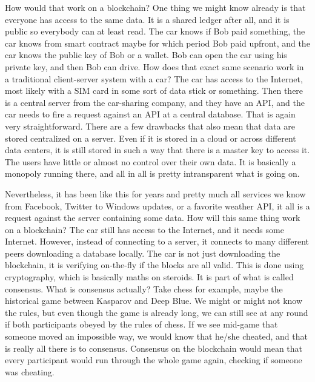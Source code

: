 How would that work on a blockchain? One thing we might know already is that everyone has access to the same data. It is a shared ledger after all, and it is public so everybody can at least read. The car knows if Bob paid something, the car knows from smart contract maybe for which period Bob paid upfront, and the car knows the public key of Bob or a wallet. Bob can open the car using his private key, and then Bob can drive. How does that exact same scenario work in a traditional client-server system with a car? The car has access to the Internet, most likely with a SIM card in some sort of data stick or something. Then there is a central server from the car-sharing company, and they have an API, and the car needs to fire a request against an API at a central database. That is again very straightforward. There are a few drawbacks that also mean that data are stored centralized on a server. Even if it is stored in a cloud or across different data centers, it is still stored in such a way that there is a master key to access it. The users have little or almost no control over their own data. It is basically a monopoly running there, and all in all is pretty intransparent what is going on.

Nevertheless, it has been like this for years and pretty much all services we know from Facebook, Twitter to Windows updates, or a favorite weather API, it all is a request against the server containing some data. How will this same thing work on a blockchain? The car still has access to the Internet, and it needs some Internet. However, instead of connecting to a server, it connects to many different peers downloading a database locally. The car is not just downloading the blockchain, it is verifying on-the-fly if the blocks are all valid. This is done using cryptography, which is basically maths on steroids. It is part of what is called consensus. What is consensus actually? Take chess for example, maybe the historical game between Kasparov and Deep Blue. We might or might not know the rules, but even though the game is already long, we can still see at any round if both participants obeyed by the rules of chess. If we see mid-game that someone moved an impossible way, we would know that he/she cheated, and that is really all there is to consensus. Consensus on the blockchain would mean that every participant would run through the whole game again, checking if someone was cheating. 

